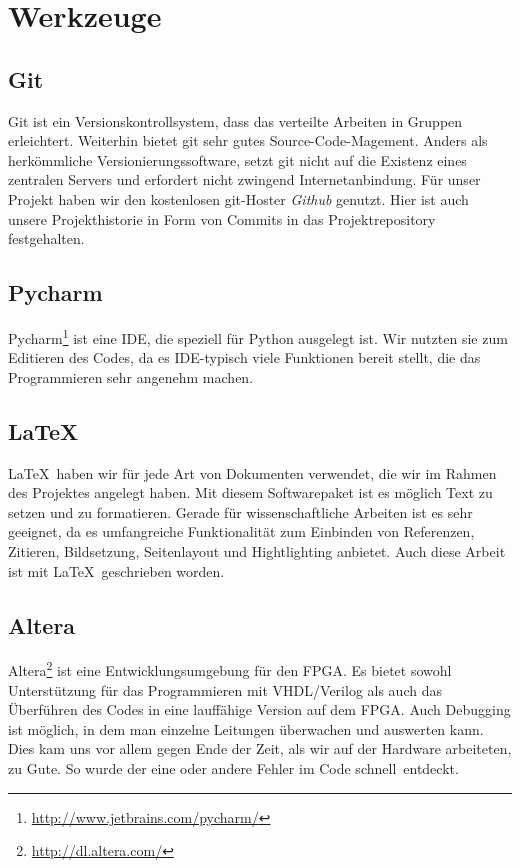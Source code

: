 \section{Werkzeuge}
\subsection{Git}
Git ist ein Versionskontrollsystem, dass das verteilte Arbeiten in Gruppen erleichtert. Weiterhin bietet git sehr gutes Source-Code-Magement. Anders als herkömmliche Versionierungssoftware, setzt git nicht auf die Existenz eines zentralen Servers und erfordert nicht zwingend Internetanbindung.
Für unser Projekt haben wir den kostenlosen git-Hoster \textit{Github} genutzt. Hier ist auch unsere Projekthistorie in Form von Commits in das Projektrepository festgehalten.

\subsection{Pycharm}
Pycharm\footnote{\url{http://www.jetbrains.com/pycharm/}} ist eine IDE, die speziell für Python ausgelegt ist. Wir nutzten sie zum Editieren des Codes, da es IDE-typisch viele Funktionen bereit stellt, die das Programmieren sehr angenehm machen.

\subsection{\LaTeX}
\LaTeX \ haben wir für jede Art von Dokumenten verwendet, die wir im Rahmen des Projektes angelegt haben. Mit diesem Softwarepaket ist es möglich Text zu setzen und zu formatieren. Gerade für wissenschaftliche Arbeiten ist es sehr geeignet, da es umfangreiche Funktionalität zum Einbinden von Referenzen, Zitieren, Bildsetzung, Seitenlayout und Hightlighting anbietet. Auch diese Arbeit ist mit \LaTeX \ geschrieben worden.

\subsection{Altera}
Altera\footnote{\url{http://dl.altera.com/}} ist eine Entwicklungsumgebung für den FPGA. Es bietet sowohl Unterstützung für das Programmieren mit VHDL/Verilog als auch das Überführen des Codes in eine lauffähige Version auf dem FPGA. Auch Debugging ist möglich, in dem man einzelne Leitungen überwachen und auswerten kann. Dies kam uns vor allem gegen Ende der Zeit, als wir auf der Hardware arbeiteten, zu Gute. So wurde der eine oder andere Fehler im Code \glqq schnell\grqq \ entdeckt. 


